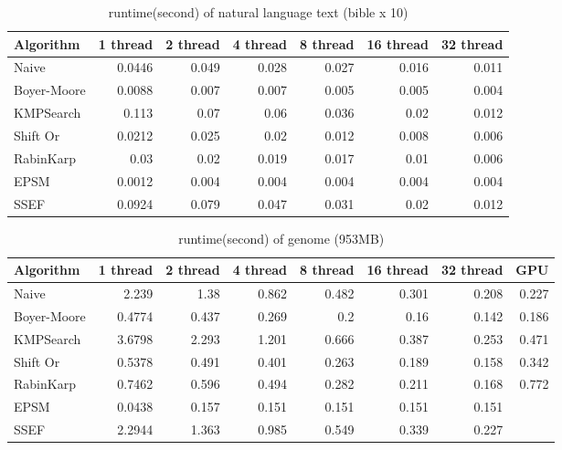 \documentclass[11pt]{article}       %
\begin{document}
\begin{table}[htbp]
  \centering
  \caption{runtime(second) of natural language text (bible x 10)}
    \begin{tabular}{lrrrrrr}\label{t10}
Algorithm & 1 thread & 2 thread & 4 thread & 8 thread & 16 thread & 32 thread \\
 \hline
    Naive & 0.0446 & 0.049 & 0.028 & 0.027 & 0.016 & 0.011 \\
    Boyer-Moore & 0.0088 & 0.007 & 0.007 & 0.005 & 0.005 & 0.004 \\
    KMPSearch & 0.113 & 0.07  & 0.06  & 0.036 & 0.02  & 0.012 \\
    Shift Or & 0.0212 & 0.025 & 0.02  & 0.012 & 0.008 & 0.006 \\
    RabinKarp & 0.03  & 0.02  & 0.019 & 0.017 & 0.01  & 0.006 \\
    EPSM  & 0.0012 & 0.004 & 0.004 & 0.004 & 0.004 & 0.004 \\
    SSEF  & 0.0924 & 0.079 & 0.047 & 0.031 & 0.02  & 0.012 \\
    \end{tabular}%
  \label{tab:addlabel}%
\end{table}%


\begin{table}[htbp]
  \centering
  \caption{runtime(second) of genome (953MB)}
    \begin{tabular}{lrrrrrrr}\label{t5}
Algorithm & 1 thread & 2 thread & 4 thread & 8 thread & 16 thread & 32 thread & GPU \\
 \hline
    Naive & 2.239 & 1.38  & 0.862 & 0.482 & 0.301 & 0.208 & 0.227 \\
    {Boyer-Moore} & 0.4774 & 0.437 & 0.269 & 0.2   & 0.16  & 0.142 & 0.186 \\
    KMPSearch & 3.6798 & 2.293 & 1.201 & 0.666 & 0.387 & 0.253 & 0.471 \\
    Shift Or & 0.5378 & 0.491 & 0.401 & 0.263 & 0.189 & 0.158 & 0.342 \\
    RabinKarp & 0.7462 & 0.596 & 0.494 & 0.282 & 0.211 & 0.168 & 0.772 \\
    EPSM  & 0.0438 & 0.157 & 0.151 & 0.151 & 0.151 & 0.151  \\
    SSEF  & 2.2944 & 1.363 & 0.985 & 0.549 & 0.339 & 0.227  \\
    \end{tabular}%
  \label{tab:addlabel}%
\end{table}%
\end{document}
